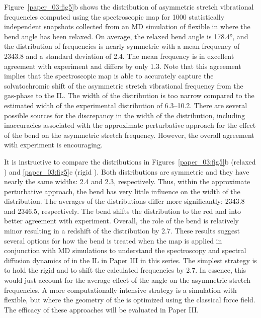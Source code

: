 Figure~\ref{paper_03:fig5}b shows the distribution of  asymmetric stretch vibrational frequencies computed using the spectroscopic map for \num{1000} statistically independent snapshots collected from an MD simulation of flexible  in \ce{[C4C1im][PF6]} where the  bend angle has been relaxed. On average, the relaxed bend angle is \ang{178.4}, and the distribution of frequencies is nearly symmetric with a mean frequency of \SI{2343.8}{\wavenumber} and a standard deviation of \SI{2.4}{\wavenumber}. The mean frequency is in excellent agreement with experiment and differs by only \SI{1.3}{\wavenumber}. Note that this agreement implies that the spectroscopic map is able to accurately capture the solvatochromic shift of the  asymmetric stretch vibrational frequency from the gas-phase to the \ce{[C4C1im][PF6]} IL. The width of the distribution is too narrow compared to the estimated width of the experimental distribution of \SIrange{6.3}{10.2}{\wavenumber}. There are several possible sources for the discrepancy in the width of the distribution, including inaccuracies associated with the approximate perturbative approach for the effect of the bend on the asymmetric stretch frequency. However, the overall agreement with experiment is encouraging.

It is instructive to compare the distributions in Figures~\ref{paper_03:fig5}b (relaxed ) and \ref{paper_03:fig5}c (rigid ). Both distributions are symmetric and they have nearly the same widths: \SI{2.4}{\wavenumber} and \SI{2.3}{\wavenumber}, respectively. Thus, within the approximate perturbative approach, the bend has very little influence on the width of the distribution. The averages of the distributions differ more significantly: \SI{2343.8}{\wavenumber} and \SI{2346.5}{\wavenumber}, respectively. The bend shifts the distribution to the red and into better agreement with experiment. Overall, the role of the bend is relatively minor resulting in a redshift of the distribution by \SI{2.7}{\wavenumber}. These results suggest several options for how the bend is treated when the map is applied in conjunction with MD simulations to understand the spectroscopy and spectral diffusion dynamics of  in the \ce{[C4C1im][PF6]} IL in Paper III\cite{PaperIII} in this series. The simplest strategy is to hold the  rigid and to shift the calculated frequencies by \SI{2.7}{\wavenumber}. In essence, this would just account for the average effect of the  angle on the asymmetric stretch frequencies. A more computationally intensive strategy is a simulation with  flexible, but where the geometry of the  is optimized using the classical force field. The efficacy of these approaches will be evaluated in Paper III\cite{PaperIII}.

